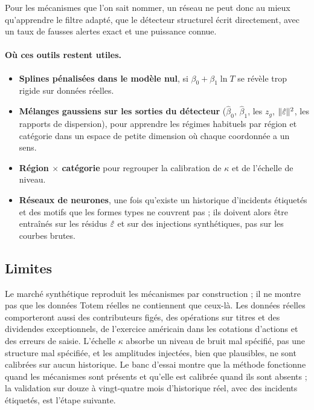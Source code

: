 Pour les mécanismes que l'on sait nommer, un réseau ne peut donc au mieux qu'apprendre le filtre adapté, que le
détecteur structurel écrit directement, avec un taux de fausses alertes exact et une puissance connue.

\paragraph{Où ces outils restent utiles.}
\begin{itemize}
\item \textbf{Splines pénalisées dans le modèle nul}, si $\beta_0+\beta_1\ln T$ se révèle trop rigide sur données réelles.
\item \textbf{Mélanges gaussiens sur les sorties du détecteur} ($\hat\beta_0$, $\hat\beta_1$, les $z_g$, $\lVert \hat\varepsilon\rVert^2$,
les rapports de dispersion), pour apprendre les régimes habituels par région et catégorie dans un espace de petite
dimension où chaque coordonnée a un sens.
\item \textbf{Région $\times$ catégorie} pour regrouper la calibration de $\kappa$ et de l'échelle de niveau.
\item \textbf{Réseaux de neurones}, une fois qu'existe un historique d'incidents étiquetés et des motifs que les formes
types ne couvrent pas ; ils doivent alors être entraînés sur les résidus $\hat\varepsilon$ et sur des injections synthétiques, pas
sur les courbes brutes.
\end{itemize}

\subsection{Limites}
\begin{attention}
Le marché synthétique reproduit les mécanismes par construction ; il ne montre pas que les données Totem réelles ne
contiennent que ceux-là. Les données réelles comporteront aussi des contributeurs figés, des opérations sur titres et
des dividendes exceptionnels, de l'exercice américain dans les cotations d'actions et des erreurs de saisie. L'échelle
$\kappa$ absorbe un niveau de bruit mal spécifié, pas une structure mal spécifiée, et les amplitudes injectées, bien que
plausibles, ne sont calibrées sur aucun historique. Le banc d'essai montre que la méthode fonctionne quand les
mécanismes sont présents et qu'elle est calibrée quand ils sont absents ; la validation sur douze à vingt-quatre mois
d'historique réel, avec des incidents étiquetés, est l'étape suivante.
\end{attention}


